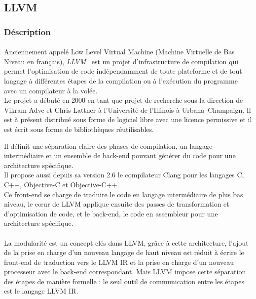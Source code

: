 \subsection{LLVM}
\subsubsection{Déscription}
\paragraph{}
\sloppy
Anciennement appelé \og{} Low Level Virtual Machine \fg{} (Machine Virtuelle de
Bas Niveau en français), \emph{LLVM}~\cite{llvm} est un projet d'infrastructure
de compilation qui permet l'optimisation de code indépendamment de toute
plateforme et de tout langage à différentes étapes de la compilation ou à
l'exécution du programme avec un compilateur à la volée.\\
Le projet a débuté en 2000 en tant que projet de recherche sous la direction de
Vikram Adve et Chris Lattner à l'Université de l'Illinois à Urbana–Champaign. Il
est à présent distribué sous forme de logiciel libre avec une licence permissive
et il est écrit sous forme de bibliothèques réutilisables.

Il définit une séparation claire des phases de compilation, un langage
intermédiaire et un ensemble de back-end pouvant générer du code pour une
architecture spécifique.\\
Il propose aussi depuis sa version 2.6 le compilateur Clang pour les langages C,
C++, Objective-C et Objective-C++.\\
Ce front-end se charge de traduire le code en langage intermédiaire de plus bas
niveau, le c\oe{}ur de LLVM applique ensuite des passes de transformation et
d'optimisation de code, et le back-end, le code en assembleur pour une
architecture spécifique.

\paragraph{}
La modularité est un concept clés dans LLVM, grâce à cette architecture, l'ajout
de la prise en charge d'un nouveau langage de haut niveau est réduit à écrire le
front-end de traduction vers le LLVM IR et la prise en charge d'un nouveau
processeur avec le back-end correspondant. Mais LLVM impose cette séparation des
étapes de manière formelle : le seul outil de communication entre les étapes est
le langage LLVM IR.

